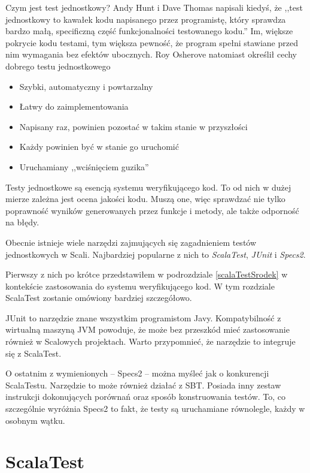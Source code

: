 \documentclass[wimgr]{xmgr}
\begin{document}
Czym jest test jednostkowy? Andy Hunt i Dave Thomas napisali kiedyś, że ,,test jednostkowy to kawałek kodu napisanego przez programistę, który sprawdza bardzo małą, specificzną część funkcjonalności testowanego kodu.''\cite[s.3]{Hunt:2003:PUT} Im, większe pokrycie kodu testami, tym większa pewność, że program spełni stawiane przed nim wymagania bez efektów ubocznych. Roy Osherove natomiast określił cechy dobrego testu jednostkowego \cite[s. 6]{Osherove:2009:TAOUT} 

\begin{itemize}
\item Szybki, automatyczny i powtarzalny
\item Łatwy do zaimplementowania
\item Napisany raz, powinien pozostać w takim stanie w przyszłości
\item Każdy powinien być w stanie go uruchomić
\item Uruchamiany ,,wciśnięciem guzika'' 
\end{itemize}

Testy jednostkowe są esencją systemu weryfikującego kod. To od nich w dużej mierze zależna jest ocena jakości kodu. Muszą one, więc sprawdzać nie tylko poprawność wyników generowanych przez funkcje i metody, ale także odporność na błędy.  

Obecnie istnieje wiele narzędzi zajmujących się zagadnieniem testów jednostkowych w Scali. Najbardziej popularne z nich to \emph{ScalaTest}, \emph{JUnit} i \emph{Specs2}.

Pierwszy z nich po krótce przedstawiłem w podrozdziale \ref{scalaTestSrodek} w kontekście zastosowania do systemu weryfikującego kod. W tym rozdziale ScalaTest zostanie omówiony bardziej szczegółowo. 

JUnit to narzędzie znane wszystkim programistom Javy. Kompatybilność z wirtualną maszyną JVM powoduje, że może bez przeszkód mieć zastosowanie również w Scalowych projektach. Warto przypomnieć, że narzędzie to integruje się z ScalaTest. 

O ostatnim z wymienionych -- Specs2 -- można myśleć jak o konkurencji ScalaTestu. Narzędzie to może również działać z SBT. Posiada inny zestaw instrukcji dokonujących porównań oraz sposób konstruowania testów. To, co szczególnie wyróżnia Specs2 to fakt, że testy są uruchamiane równolegle, każdy w osobnym wątku.
      
\section{ScalaTest}
\end{document}
